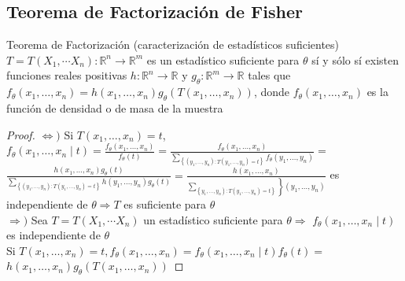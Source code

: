   
  \subsection*{Teorema de Factorización de Fisher}
  
  \begin{teorema}
    Teorema de Factorización (caracterización de estadísticos suficientes) $T=T\left(X_{1}, \cdots X_{n}\right): \mathbb{R}^{n} \longrightarrow \mathbb{R}^{m}$ es un estadístico suficiente para $\theta$ sí y sólo sí existen funciones reales positivas $h: \mathbb{R}^{n} \longrightarrow \mathbb{R}$ y $g_{\theta}: \mathbb{R}^{m} \longrightarrow \mathbb{R}$ tales que $f_{\theta}\left(x_{1}, \ldots, x_{n}\right)=h\left(x_{1}, \ldots, x_{n}\right) g_{\theta}\left(T\left(x_{1}, \ldots, x_{n}\right)\right)$, donde $f_{\theta}\left(x_{1}, \ldots, x_{n}\right)$ es la función de densidad o de masa de la muestra
  \end{teorema}
  
  
  \begin{proof}
    \leavevmode
    $\Leftrightarrow)$ Si $T\left(x_{1}, \ldots, x_{n}\right)=t$,\\
    $f_{\theta}\left(x_{1}, \ldots, x_{n} \mid t\right)=\frac{f_{\theta}\left(x_{1}, \ldots, x_{n}\right)}{f_{\theta}(t)}=\frac{f_{\theta}\left(x_{1}, \ldots, x_{n}\right)}{\sum_{\left\{\left(y_{1}, \ldots, y_{n}\right): T\left(y_{1}, \ldots, y_{n}\right)=t\right\}} f_{\theta}\left(y_{1}, \ldots, y_{n}\right)}=$\\
    $\frac{h\left(x_{1}, \ldots, x_{n}\right) g_{\theta}(t)}{\sum_{\left\{\left(y_{1}, \ldots, y_{n}\right): T\left(y_{1}, \ldots, y_{n}\right)=t\right\}} h\left(y_{1}, \ldots, y_{n}\right) g_{\theta}(t)}=\frac{h\left(x_{1}, \ldots, x_{n}\right)}{\left.\sum_{\left.\left\{y_{1}, \ldots, y_{n}\right): T\left(y_{1}, \ldots, y_{n}\right)=t\right\}}\right\}\left(y_{1}, \ldots, y_{n}\right)}$ es\\
    independiente de $\theta \Rightarrow T$ es suficiente para $\theta$\\
    $\Rightarrow)$ Sea $T=T\left(X_{1}, \cdots X_{n}\right)$ un estadístico suficiente para $\theta \Rightarrow$ $f_{\theta}\left(x_{1}, \ldots, x_{n} \mid t\right)$ es independiente de $\theta$\\
    Si $T\left(x_{1}, \ldots, x_{n}\right)=t, f_{\theta}\left(x_{1}, \ldots, x_{n}\right)=f_{\theta}\left(x_{1}, \ldots, x_{n} \mid t\right) f_{\theta}(t)=$ $h\left(x_{1}, \ldots, x_{n}\right) g_{\theta}\left(T\left(x_{1}, \ldots, x_{n}\right)\right)$
  \end{proof}
  

